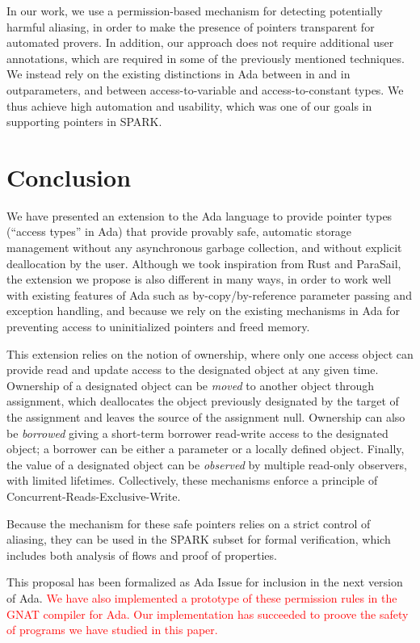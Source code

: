 \documentclass{llncs}
\newcommand\maroua[1]{\textcolor{red}{#1}}
\newcommand{\keyword}[1]{\textsf{#1}}
\begin{document}
In our work, we use a permission-based mechanism for detecting potentially harmful aliasing, in order to make the presence of pointers transparent for automated provers.
In addition, our approach does not require additional user annotations, which are required in some of the previously mentioned techniques.  We instead rely on the existing distinctions in Ada between \keyword{in} and \keyword{in out}parameters, and between access-to-variable and access-to-constant types. We thus achieve high automation
and usability, which was one of our goals in supporting pointers in SPARK.


\section{Conclusion}
We have presented an extension to the Ada language to provide pointer types (``access types'' in Ada) that provide provably safe, automatic
storage management without any asynchronous garbage collection, and without explicit deallocation by the user. Although we took inspiration
from Rust and ParaSail, the extension we propose is also different in many ways, in order to work well with existing features of Ada such
as by-copy/by-reference parameter passing and exception handling, and because we rely on the existing mechanisms in Ada for preventing access
to uninitialized pointers and freed memory.

This extension relies on the notion of ownership, where only one access object can provide read and update access to the designated object at any given time.
Ownership of a designated object can be \textit{moved} to another object through assignment, which deallocates the object previously designated
by the target of the assignment and leaves the source of the assignment null. Ownership can also be \textit{borrowed} giving a short-term borrower read-write access to the designated object; a borrower
can be either a parameter or a locally defined object. Finally, the value of a designated object can be \textit{observed} by multiple
read-only observers, with limited lifetimes. Collectively, these mechanisms enforce a principle of Concurrent-Reads-Exclusive-Write.

Because the mechanism for these safe pointers relies on a strict control of aliasing, they can be used in the SPARK subset for formal verification, which
includes both analysis of flows and proof of properties.

This proposal has been formalized as Ada Issue \cite{AI2018} for inclusion in the next version of Ada. \maroua{We have also implemented a prototype of these permission rules in the GNAT
compiler for Ada. Our implementation has succeeded to proove the safety of programs we have studied in this paper.}

\nolinenumbers
\printbibliography[title={References}]
\end{document}
